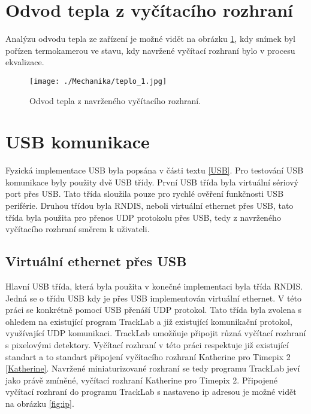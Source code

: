 \section{Odvod tepla z vyčítacího rozhraní}
Analýzu odvodu tepla ze zařízení je možné vidět na obrázku \ref{fig:teplo}, kdy snímek byl pořízen termokamerou ve stavu, kdy navržené vyčítací rozhraní bylo v procesu ekvalizace.
\begin{figure}[h!]
	\centering
	\captionsetup{justification=centering}
	\texttt{[image: ./Mechanika/teplo\_1.jpg]}
	\caption{Odvod tepla z navrženého vyčítacího rozhraní.} 
	\label{fig:teplo}
\end{figure}

\section{USB komunikace}
Fyzická implementace USB byla popsána v části textu \ref{USB}. Pro testování USB komunikace byly použity dvě USB třídy. První USB třída byla virtuální sériový port přes USB. Tato třída sloužila pouze pro rychlé ověření funkčnosti USB periférie. Druhou třídou byla RNDIS, neboli virtuální ethernet přes USB, tato třída byla použita pro přenos UDP protokolu přes USB, tedy z navrženého vyčítacího rozhraní směrem k uživateli.
\subsection{Virtuální ethernet přes USB}
Hlavní USB třída, která byla použita v konečné implementaci byla třída RNDIS. Jedná se o třídu USB kdy je přes USB implementován virtuální ethernet. V této práci se konkrétně pomocí USB přenáší UDP protokol. Tato třída byla zvolena s ohledem na existující program TrackLab \cite{Manek_2024} a již existující komunikační protokol, využívající UDP komunikaci. TrackLab umožňuje připojit různá vyčítací rozhraní s pixelovými detektory. Vyčítací rozhraní v této práci respektuje již existující standart a to standart připojení vyčítacího rozhraní Katherine pro Timepix 2 \ref{Katherine}. Navržené miniaturizované rozhraní se tedy programu TrackLab jeví jako právě zmíněné, vyčítací rozhraní Katherine pro Timepix 2. Připojené vyčítací rozhraní do programu TrackLab s nastaveno ip adresou je možné vidět na obrázku \ref{fig:ip}.

